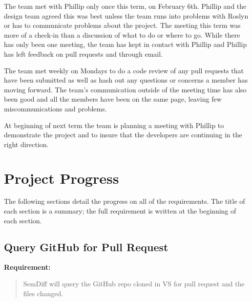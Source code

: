 \documentclass[draftclsnofoot,onecolumn]{IEEEtran}
\begin{document}
The team met with Phillip only once this term, on February 6th. Phillip and the 
design team agreed this was best unless the team runs into problems with Roslyn 
or has to communicate problems about the project. The meeting this term was 
more of a check-in than a discussion of what to do or where to go. While there 
has only been one meeting, the team has kept in contact with Phillip and 
Phillip has left feedback on pull requests and through email.

The team met weekly on Mondays to do a code review of any pull requests that 
have been submitted as well as hash out any questions or concerns a member has 
moving forward. The team’s communication outside of the meeting time has also 
been good and all the members have been on the same page, leaving few 
miscommunications and problems.

At beginning of next term the team is planning a meeting with Phillip to 
demonstrate the project and to insure that the developers are continuing in the 
right direction.

\section{Project Progress}%

The following sections detail the progress on all of the requirements. The 
title of each section is a summary; the full requirement is written at the 
beginning of each section.

\subsection{Query GitHub for Pull Request}%

\textbf{Requirement:}

\begin{quote}

SemDiff will query the GitHub repo cloned in VS for pull request and the files 
changed.

\end{quote}
\end{document}
